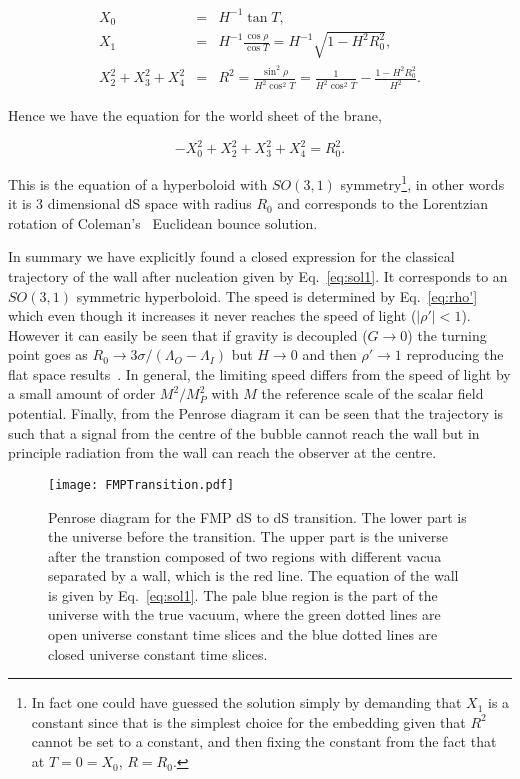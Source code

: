 \documentclass[a4paper,11pt]{article}
\numberwithin{equation}{section}
\begin{document}
\begin{eqnarray}
X_0&=& H^{-1}\tan T,\nonumber \\
 X_1&=&H^{-1} \frac {\cos\rho}{\cos T}=H^{-1}\sqrt{1-H^2R_0^2},\nonumber \\
X_2^2+X_3^2+X_4^2&=&R^2=\frac{\sin^2{\rho}}{H^2\cos^2 T} =   \frac{1}{H^2\cos^2T}-\frac{1-H^2R_0^2}{H^2}.
\end{eqnarray}

Hence we have the equation for the world sheet of the brane,

 \begin{equation}
-X_0^2+X_2^2+X_3^2+X_4^2=R_0^2.
\end{equation}\label{eq:braneworld}


This is the equation of a hyperboloid with  $SO(3,1)$ symmetry\footnote{In fact one could have guessed the solution simply by demanding that $X_1$ is a constant since that is the simplest choice for the embedding given that $R^2$ cannot be set to a constant, and then fixing the constant from the fact that at $T=0=X_0$, $R=R_0$.}, in other words it is 3 dimensional dS space with radius $R_0$   and  corresponds to the Lorentzian rotation of Coleman's~\cite{Coleman:1980aw} Euclidean bounce solution.

In summary we have explicitly found a closed expression for the classical trajectory of the wall after nucleation given by Eq.~\eqref{eq:sol1}. It corresponds to an $SO(3,1)$ symmetric  hyperboloid. The speed is determined by Eq.~\eqref{eq:rho'} which even though it increases it never reaches the speed of light ($|\rho'|<1$). However it can easily be seen that if gravity is decoupled ($G\rightarrow 0$) the turning point goes as $R_0\rightarrow 3\sigma/(\Lambda_O-\Lambda_I)$ but $H\rightarrow 0$ and then $\rho'\rightarrow 1$ reproducing the flat space results~\cite{Aguirre:2008wy}. In general, the limiting speed differs from the speed of light by a small amount of order $M^2/M_P^2$ with $M$ the reference scale of the scalar field potential. Finally, from the Penrose diagram it can be seen that the trajectory is such that a signal from the centre of the bubble cannot reach the wall but in principle radiation from the wall can reach the observer at the centre.


\begin{figure}[h!] 
\begin{center} 
\texttt{[image: FMPTransition.pdf]}
\caption{Penrose diagram for the FMP dS to dS transition.
The lower part is the universe before the transition. The upper part  is the universe after the transtion composed of two  regions with different vacua separated by a wall, which is  the red line. The equation of the wall is given by Eq.~\eqref{eq:sol1}. The pale blue region is the part of the universe with the true vacuum, where the green dotted lines are open universe constant time slices and the blue dotted lines are closed universe constant time slices.\label{fig:Potential}}
\end{center} 
\end{figure}
\end{document}
